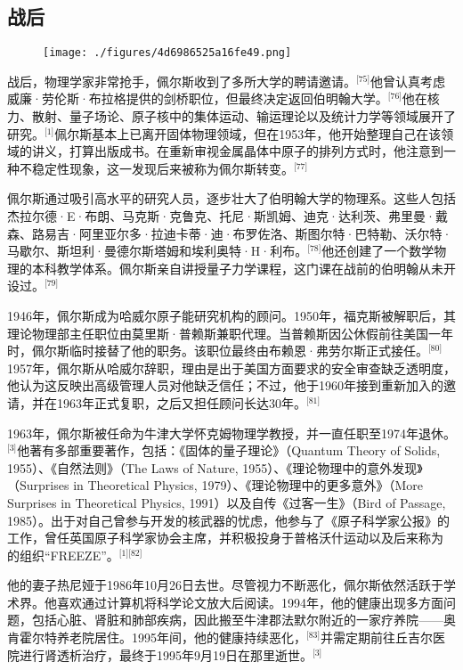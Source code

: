 \subsection{战后}
\begin{figure}[ht]
\centering
\texttt{[image: ./figures/4d6986525a16fe49.png]}
\caption{} \label{fig_LDF_5}
\end{figure}
战后，物理学家非常抢手，佩尔斯收到了多所大学的聘请邀请。\(^\text{[75]}\)他曾认真考虑威廉·劳伦斯·布拉格提供的剑桥职位，但最终决定返回伯明翰大学。\(^\text{[76]}\)他在核力、散射、量子场论、原子核中的集体运动、输运理论以及统计力学等领域展开了研究。\(^\text{[1]}\)佩尔斯基本上已离开固体物理领域，但在1953年，他开始整理自己在该领域的讲义，打算出版成书。在重新审视金属晶体中原子的排列方式时，他注意到一种不稳定性现象，这一发现后来被称为佩尔斯转变。\(^\text{[77]}\)

佩尔斯通过吸引高水平的研究人员，逐步壮大了伯明翰大学的物理系。这些人包括杰拉尔德·E·布朗、马克斯·克鲁克、托尼·斯凯姆、迪克·达利茨、弗里曼·戴森、路易吉·阿里亚尔多·拉迪卡蒂·迪·布罗佐洛、斯图尔特·巴特勒、沃尔特·马歇尔、斯坦利·曼德尔斯塔姆和埃利奥特·H·利布。\(^\text{[78]}\)他还创建了一个数学物理的本科教学体系。佩尔斯亲自讲授量子力学课程，这门课在战前的伯明翰从未开设过。\(^\text{[79]}\)

1946年，佩尔斯成为哈威尔原子能研究机构的顾问。1950年，福克斯被解职后，其理论物理部主任职位由莫里斯·普赖斯兼职代理。当普赖斯因公休假前往美国一年时，佩尔斯临时接替了他的职务。该职位最终由布赖恩·弗劳尔斯正式接任。\(^\text{[80]}\)1957年，佩尔斯从哈威尔辞职，理由是出于美国方面要求的安全审查缺乏透明度，他认为这反映出高级管理人员对他缺乏信任；不过，他于1960年接到重新加入的邀请，并在1963年正式复职，之后又担任顾问长达30年。\(^\text{[81]}\)

1963年，佩尔斯被任命为牛津大学怀克姆物理学教授，并一直任职至1974年退休。\(^\text{[3]}\)他著有多部重要著作，包括：《固体的量子理论》（Quantum Theory of Solids, 1955）、《自然法则》（The Laws of Nature, 1955）、《理论物理中的意外发现》（Surprises in Theoretical Physics, 1979）、《理论物理中的更多意外》（More Surprises in Theoretical Physics, 1991）以及自传《过客一生》（Bird of Passage, 1985）。出于对自己曾参与开发的核武器的忧虑，他参与了《原子科学家公报》的工作，曾任英国原子科学家协会主席，并积极投身于普格沃什运动以及后来称为 的组织“FREEZE”。\(^\text{[1][82]}\)

他的妻子热尼娅于1986年10月26日去世。尽管视力不断恶化，佩尔斯依然活跃于学术界。他喜欢通过计算机将科学论文放大后阅读。1994年，他的健康出现多方面问题，包括心脏、肾脏和肺部疾病，因此搬至牛津郡法默尔附近的一家疗养院——奥肯霍尔特养老院居住。1995年间，他的健康持续恶化，\(^\text{[83]}\)并需定期前往丘吉尔医院进行肾透析治疗，最终于1995年9月19日在那里逝世。\(^\text{[3]}\)
